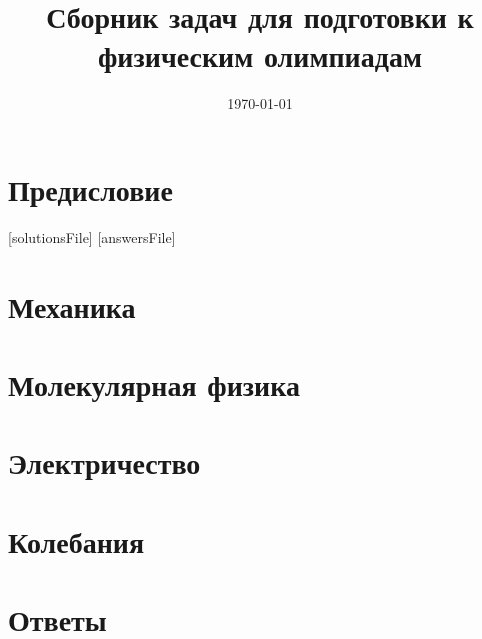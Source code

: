 \documentclass[a5paper, oneside]{book}
\title{Сборник задач для подготовки к физическим олимпиадам}
\date{\today}
\begin{document}
\maketitle
\tableofcontents

\chapter*{Предисловие} 


[solutionsFile]
[answersFile]


\chapter{Механика}









\chapter{Молекулярная физика}



\chapter{Электричество}






\chapter{Колебания}





\chapter{Ответы}
\end{document}
